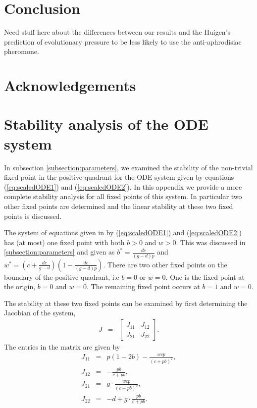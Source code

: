 \documentclass[review,authoryear]{elsarticle}
\begin{document}
\section{Conclusion}

Need stuff here about the differences between our results and the Huigen's prediction of evolutionary pressure to be less likely to use the anti-aphrodisiac pheromone.

\section{Acknowledgements}

\clearpage

\appendix

\section{Stability analysis of the ODE system}
\label{appendix:otherFixedPoints}

In subsection \ref{subsection:parameters}, we examined the stability of the
non-trivial fixed point in the positive quadrant for the ODE system given by equations (\ref{eq:scaledODE1}) and
(\ref{eq:scaledODE2}). In this appendix we provide a more complete stability analysis for all fixed points of this system.  In particular  two other
fixed points are determined and the linear
stability at these two fixed points is discussed.

The  system of equations given in by
(\ref{eq:scaledODE1}) and (\ref{eq:scaledODE2}) has (at most) one fixed point
with both $b>0$ and $w>0$.  This was discussed in \ref{subsection:parameters} and given as $b^*= \frac{dc}{(g-d)p}$ and $w^* = (c+\frac{dc}{g-d})(1- \frac{dc}{(g-d)p}).$  There are two other fixed points on the boundary of the positive quadrant, i.e $b=0$ or $w=0$.  One is the fixed point at the origin, $b=0$ and $w=0$.
The remaining fixed point occurs at $b=1$ and $w=0$. 
  

The stability at these two fixed points can be examined by first
determining the Jacobian of the system,
\begin{eqnarray*}
  J & = & \left[
          \begin{array}{rr}
            J_{11} & J_{12} \\
            J_{21} & J_{22}
          \end{array}
          \right].
\end{eqnarray*}
The entries in the matrix are given by
\begin{eqnarray*}
  J_{11} & = & p(1-2b) -
               \frac{w  c   p}{\left( c + pb \right)^2}, \\
  J_{12} & = & -\frac{pb}{c+pb}, \\
  J_{21} & = & g \cdot\frac{wcp}{(c+pb)^2}, \\
  J_{22} & = & -d + g  \cdot \frac{pb}{c+pb}.
\end{eqnarray*}
\end{document}
